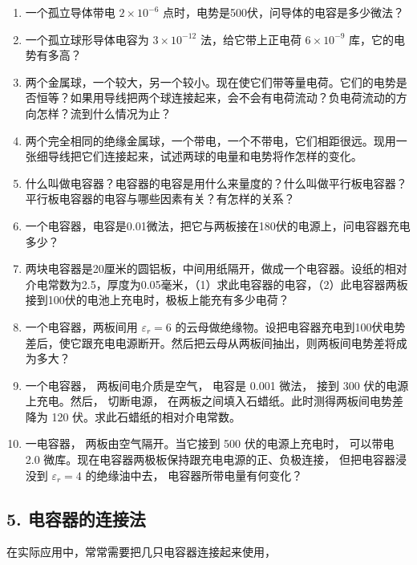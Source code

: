 \begin{enumerate}
\def\labelenumi{\arabic{enumi}.}
\item
  一个孤立导体带电 \(2 \times 10^{-6}\)
  点时，电势是500伏，问导体的电容是多少微法？
\item
  一个孤立球形导体电容为 \(3 \times 10^{-12}\) 法，给它带上正电荷
  \(6 \times 10^{-9}\) 库，它的电势有多高？
\item
  两个金属球，一个较大，另一个较小。现在使它们带等量电荷。它们的电势是否恒等？如果用导线把两个球连接起来，会不会有电荷流动？负电荷流动的方向怎样？流到什么情况为止？
\item
  两个完全相同的绝缘金属球，一个带电，一个不带电，它们相距很远。现用一张细导线把它们连接起来，试述两球的电量和电势将作怎样的变化。
\item
  什么叫做电容器？电容器的电容是用什么来量度的？什么叫做平行板电容器？平行板电容器的电容与哪些因素有关？有怎样的关系？
\item
  一个电容器，电容是0.01微法，把它与两板接在180伏的电源上，问电容器充电多少？
\item
  两块电容器是20厘米的圆铝板，中间用纸隔开，做成一个电容器。设纸的相对介电常数为2.5，厚度为0.05毫米，（1）求此电容器的电容，（2）此电容器两板接到100伏的电池上充电时，极板上能充有多少电荷？
\item
  一个电容器，两板间用 \(\varepsilon_{r} = 6\)
  的云母做绝缘物。设把电容器充电到100伏电势差后，使它跟充电电源断开。然后把云母从两板间抽出，则两板间电势差将成为多大？
\item
  一个电容器， 两板间电介质是空气， 电容是 0.001 微法， 接到 300
  伏的电源上充电。然后， 切断电源，
  在两板之间填入石蜡纸。此时测得两板间电势差降为 120
  伏。求此石蜡纸的相对介电常数。
\item
  一电容器， 两板由空气隔开。当它接到 500 伏的电源上充电时， 可以带电
  2.0 微库。现在电容器两极板保持跟充电电源的正、负极连接，
  但把电容器浸没到 \(\varepsilon_{r} = 4\) 的绝缘油中去，
  电容器所带电量有何变化？
\end{enumerate}

\subsection{5.
电容器的连接法}\label{ux7535ux5bb9ux5668ux7684ux8fdeux63a5ux6cd5}

在实际应用中，常常需要把几只电容器连接起来使用，


